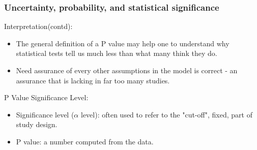 \documentclass{beamer}
\begin{document}
\begin{frame}
\frametitle{Uncertainty, probability, and statistical significance}

\begin{block}{Interpretation(contd):}
\begin{itemize}
\item The general definition of a P value may help one to
understand why statistical tests tell us much less than what
many think they do. 
\item Need assurance of every other assumptions in the model is correct - an assurance that is
lacking in far too many studies.
\end{itemize}
\end{block}

\pause

\begin{block}{P Value  Significance Level:}
\begin{itemize}
\item Significance level ($\alpha$ level): often used to refer to the "cut-off", fixed, part of study design.
\item P value: a number computed from the data. 
\end{itemize}
\end{block}

\end{frame}






\end{document}
